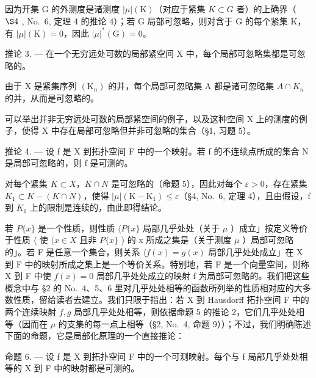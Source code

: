 因为开集 G 的外测度是诸测度 \(|\mu|(\mathrm{K})\)（对应于紧集 \(K \subset G\) 者）的上确界（ \(\S4\) , No.~6, 定理 4 的推论 4）；若 G 局部可忽略，则对含于 G 的每个紧集 K，有 \(|\mu|(\mathrm{K}) = 0\)，因此 \(|\mu|^{*}(\mathrm{G}) = 0\)。

推论 3. --- 在一个无穷远处可数的局部紧空间 X 中，每个局部可忽略集都是可忽略的。

由于 X 是紧集序列 \((\mathrm{K}_{n})\) 的并，每个局部可忽略集 A 都是诸可忽略集 \(A\cap K_{n}\) 的并，从而是可忽略的。

可以举出并非无穷远处可数的局部紧空间的例子，以及这种空间 X 上的测度的例子，使得 X 中存在局部可忽略但并非可忽略的集合（§1, 习题 5）。

推论 4. --- 设 f 是 X 到拓扑空间 F 中的一个映射。若 f 的不连续点所成的集合 N 是局部可忽略的，则 f 是可测的。

对每个紧集 \(K \subset X\)，\(K \cap N\) 是可忽略的（命题 5），因此对每个 \(\varepsilon > 0\)，存在紧集 \(K_{1} \subset K - (K \cap N)\)，使得 \(|\mu|(\mathrm{K} - \mathrm{K}_{1}) \leqslant \varepsilon\)（§4, No.~6, 定理 4），且由假设，f 到 \(K_{1}\) 上的限制是连续的，由此即得结论。

若 \(P\{x\}\) 是一个性质，则性质 \(\langle P\{x\}\) 局部几乎处处（关于 \(\mu\) ）成立」按定义等价于性质 \(\langle\) 使 \((x \in X\) 且非 \(P\{x\}\) ) 的 x 所成之集是（关于测度 \(\mu\) ）局部可忽略的」。若 F 是任意一个集合，则关系 \(\langle f(x) = g(x)\) 局部几乎处处成立」在 X 到 F 中的映射所成之集上是一个等价关系。特别地，若 F 是一个向量空间，则称 X 到 F 中使 \(f(x) = 0\) 局部几乎处处成立的映射 f 为局部可忽略的。我们把这些概念中与 §2 的 No.~4、5、6 里对几乎处处相等的函数所列举的性质相对应的大多数性质，留给读者去建立。我们只限于指出：若 X 到 Hausdorff 拓扑空间 F 中的两个连续映射 \(f, g\) 局部几乎处处相等，则依据命题 5 的推论 2，它们几乎处处相等（因而在 \(\mu\) 的支集的每一点上相等（§2, No.~4, 命题 9））；不过，我们明确陈述下面的命题，它是局部化原理的一个直接推论：

命题 6. --- 设 f 是 X 到拓扑空间 F 中的一个可测映射。每个与 f 局部几乎处处相等的 X 到 F 中的映射都是可测的。

